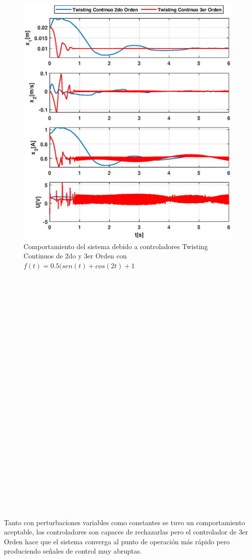 \documentclass[onecolumn,10pt]{article}
\begin{document}
\begin{figure}[!h]
\centering
\includegraphics[scale=0.55]{xu_3o_tc23o_pv.eps}
\caption{Comportamiento del sistema debido a controladores Twisting Continuos de 2do y 3er Orden con $f(t)=0.5(sen(t)+cos(2t)+1$}
\end{figure}
\\
\\
\\
\\
\\
\\
\\
\\
\\
\\
\\
\\
\\
\\
\\
\\
\\
\\
\\
\\
\\
\\
\\
\\
\\
Tanto con perturbaciones variables como constantes se tuvo un comportamiento aceptable, los controladores son capaces de rechazarlas pero el controlador de 3er Orden hace que el sistema converga al punto de operaci\'on m\'as r\'apido pero produciendo se\~nales de control muy abruptas.
\end{document}
